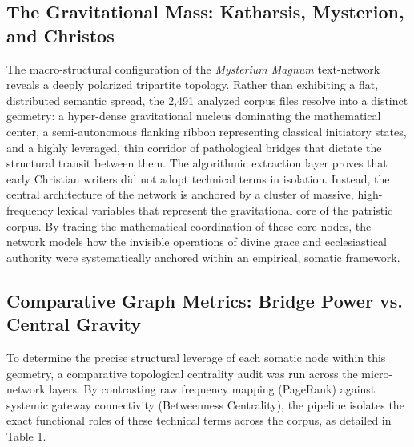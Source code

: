 \documentclass[11pt,twoside,a4paper]{article}
\begin{document}
\subsection{The Gravitational Mass: Katharsis, Mysterion, and Christos}
The macro-structural configuration of the \textit{Mysterium Magnum} text-network reveals a deeply polarized tripartite topology. Rather than exhibiting a flat, distributed semantic spread, the 2,491 analyzed corpus files resolve into a distinct geometry: a hyper-dense gravitational nucleus dominating the mathematical center, a semi-autonomous flanking ribbon representing classical initiatory states, and a highly leveraged, thin corridor of pathological bridges that dictate the structural transit between them.
The algorithmic extraction layer proves that early Christian writers did not adopt technical terms in isolation. Instead, the central architecture of the network is anchored by a cluster of massive, high-frequency lexical variables that represent the gravitational core of the patristic corpus. By tracing the mathematical coordination of these core nodes, the network models how the invisible operations of divine grace and ecclesiastical authority were systematically anchored within an empirical, somatic framework.

\subsection{Comparative Graph Metrics: Bridge Power vs. Central Gravity}
To determine the precise structural leverage of each somatic node within this geometry, a comparative topological centrality audit was run across the micro-network layers. By contrasting raw frequency mapping (PageRank) against systemic gateway connectivity (Betweenness Centrality), the pipeline isolates the exact functional roles of these technical terms across the corpus, as detailed in Table 1.
\end{document}
